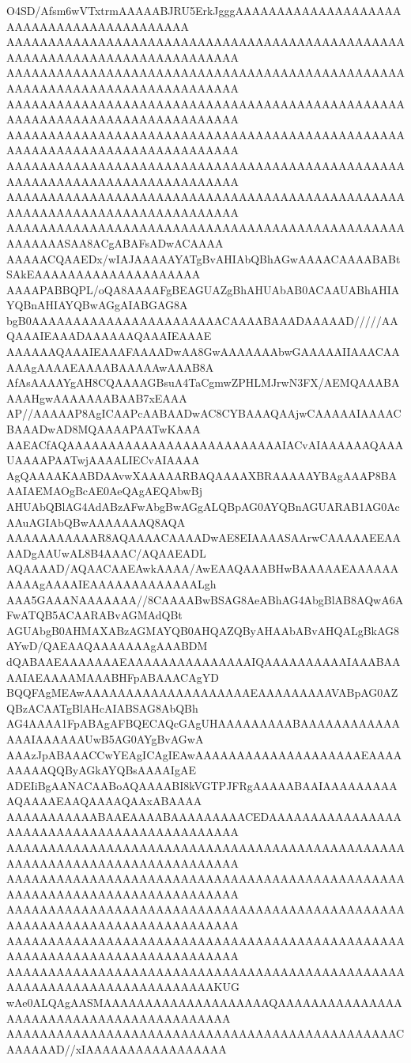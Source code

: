 O4SD/Afsm6wVTxtrmAAAAABJRU5ErkJgggAAAAAAAAAAAAAAAAAAAAAAAAAAAAAAAAAAAAAAAAAA
AAAAAAAAAAAAAAAAAAAAAAAAAAAAAAAAAAAAAAAAAAAAAAAAAAAAAAAAAAAAAAAAAAAAAAAAAAAA
AAAAAAAAAAAAAAAAAAAAAAAAAAAAAAAAAAAAAAAAAAAAAAAAAAAAAAAAAAAAAAAAAAAAAAAAAAAA
AAAAAAAAAAAAAAAAAAAAAAAAAAAAAAAAAAAAAAAAAAAAAAAAAAAAAAAAAAAAAAAAAAAAAAAAAAAA
AAAAAAAAAAAAAAAAAAAAAAAAAAAAAAAAAAAAAAAAAAAAAAAAAAAAAAAAAAAAAAAAAAAAAAAAAAAA
AAAAAAAAAAAAAAAAAAAAAAAAAAAAAAAAAAAAAAAAAAAAAAAAAAAAAAAAAAAAAAAAAAAAAAAAAAAA
AAAAAAAAAAAAAAAAAAAAAAAAAAAAAAAAAAAAAAAAAAAAAAAAAAAAAAAAAAAAAAAAAAAAAAAAAAAA
AAAAAAAAAAAAAAAAAAAAAAAAAAAAAAAAAAAAAAAAAAAAAAAAAAAAAAASAA8ACgABAFsADwACAAAA
AAAAACQAAEDx/wIAJAAAAAYATgBvAHIAbQBhAGwAAAACAAAABABtSAkEAAAAAAAAAAAAAAAAAAAA
AAAAPABBQPL/oQA8AAAAFgBEAGUAZgBhAHUAbAB0ACAAUABhAHIAYQBnAHIAYQBwAGgAIABGAG8A
bgB0AAAAAAAAAAAAAAAAAAAAAAACAAAABAAADAAAAAD/////AAQAAAIEAAADAAAAAAQAAAIEAAAE
AAAAAAQAAAIEAAAFAAAADwAA8GwAAAAAAAbwGAAAAAIIAAACAAAAAgAAAAEAAAABAAAAAwAAAB8A
AfAsAAAAYgAH8CQAAAAGBsuA4TaCgmwZPHLMJrwN3FX/AEMQAAABAAAAHgwAAAAAAABAAB7xEAAA
AP//AAAAAP8AgICAAPcAABAADwAC8CYBAAAQAAjwCAAAAAIAAAACBAAADwAD8MQAAAAPAATwKAAA
AAEACfAQAAAAAAAAAAAAAAAAAAAAAAAAAAIACvAIAAAAAAQAAAUAAAAPAATwjAAAALIECvAIAAAA
AgQAAAAKAABDAAvwXAAAAARBAQAAAAXBRAAAAAYBAgAAAP8BAAAIAEMAOgBcAE0AeQAgAEQAbwBj
AHUAbQBlAG4AdABzAFwAbgBwAGgALQBpAG0AYQBnAGUARAB1AG0AcAAuAGIAbQBwAAAAAAAQ8AQA
AAAAAAAAAAAR8AQAAAACAAAADwAE8EIAAAASAArwCAAAAAEEAAAADgAAUwAL8B4AAAC/AQAAEADL
AQAAAAD/AQAACAAEAwkAAAA/AwEAAQAAABHwBAAAAAEAAAAAAAAAAgAAAAIEAAAAAAAAAAAAALgh
AAA5GAAANAAAAAAA//8CAAAABwBSAG8AeABhAG4AbgBlAB8AQwA6AFwATQB5ACAARABvAGMAdQBt
AGUAbgB0AHMAXABzAGMAYQB0AHQAZQByAHAAbABvAHQALgBkAG8AYwD/QAEAAQAAAAAAAgAAABDM
dQABAAEAAAAAAAEAAAAAAAAAAAAAAAIQAAAAAAAAAAIAAABAAAAIAEAAAAMAAABHFpABAAACAgYD
BQQFAgMEAwAAAAAAAAAAAAAAAAAAAAEAAAAAAAAAVABpAG0AZQBzACAATgBlAHcAIABSAG8AbQBh
AG4AAAA1FpABAgAFBQECAQcGAgUHAAAAAAAAABAAAAAAAAAAAAAAAIAAAAAAUwB5AG0AYgBvAGwA
AAAzJpABAAACCwYEAgICAgIEAwAAAAAAAAAAAAAAAAAAAAEAAAAAAAAAQQByAGkAYQBsAAAAIgAE
ADEIiBgAANACAABoAQAAAABI8kVGTPJFRgAAAAABAAIAAAAAAAAAAQAAAAEAAQAAAAQAAxABAAAA
AAAAAAAAAAABAAEAAAABAAAAAAAAACEDAAAAAAAAAAAAAAAAAAAAAAAAAAAAAAAAAAAAAAAAAAAA
AAAAAAAAAAAAAAAAAAAAAAAAAAAAAAAAAAAAAAAAAAAAAAAAAAAAAAAAAAAAAAAAAAAAAAAAAAAA
AAAAAAAAAAAAAAAAAAAAAAAAAAAAAAAAAAAAAAAAAAAAAAAAAAAAAAAAAAAAAAAAAAAAAAAAAAAA
AAAAAAAAAAAAAAAAAAAAAAAAAAAAAAAAAAAAAAAAAAAAAAAAAAAAAAAAAAAAAAAAAAAAAAAAAAAA
AAAAAAAAAAAAAAAAAAAAAAAAAAAAAAAAAAAAAAAAAAAAAAAAAAAAAAAAAAAAAAAAAAAAAAAAAAAA
AAAAAAAAAAAAAAAAAAAAAAAAAAAAAAAAAAAAAAAAAAAAAAAAAAAAAAAAAAAAAAAAAAAAAAAAAKUG
wAe0ALQAgAASMAAAAAAAAAAAAAAAAAAAAQAAAAAAAAAAAAAAAAAAAAAAAAAAAAAAAAAAAAAAAAAA
AAAAAAAAAAAAAAAAAAAAAAAAAAAAAAAAAAAAAAAAAAAAAAACAAAAAAD//xIAAAAAAAAAAAAAAAAA
